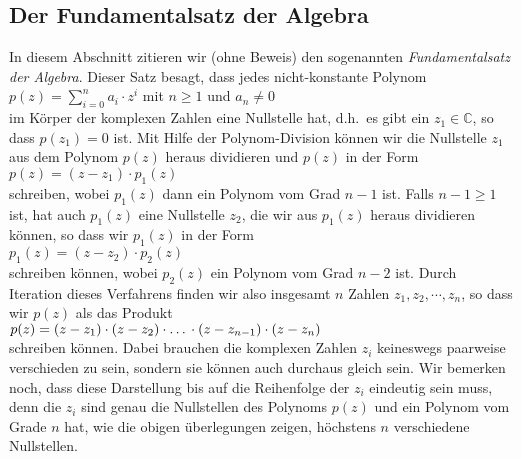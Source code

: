 \subsection{Der Fundamentalsatz der Algebra}
In diesem Abschnitt zitieren wir (ohne Beweis) den sogenannten \emph{Fundamentalsatz der Algebra}.  Dieser Satz
besagt, dass jedes nicht-konstante Polynom  
\\[0.2cm]
\hspace*{1.3cm}
$p(z) = \sum\limits_{i=0}^n a_i \cdot z^i$ \quad mit $n \geq 1$ und $a_n \not=0$
\\[0.2cm]
im K\"{o}rper der komplexen Zahlen eine Nullstelle hat, d.h.~es gibt ein $z_1 \in \mathbb{C}$, so dass
$p(z_1) = 0$ ist.  Mit Hilfe der Polynom-Division k\"{o}nnen wir die Nullstelle $z_1$ aus dem Polynom $p(z)$
heraus dividieren und $p(z)$ in der Form
\\[0.2cm]
\hspace*{1.3cm}
$p(z) = (z - z_1) \cdot p_1(z)$
\\[0.2cm]
schreiben, wobei $p_1(z)$ dann ein Polynom vom Grad $n-1$ ist.  Falls $n-1 \geq 1$ ist, hat auch
$p_1(z)$ eine Nullstelle $z_2$, die wir aus $p_1(z)$ heraus dividieren k\"{o}nnen, so dass wir $p_1(z)$
in der Form
\\[0.2cm]
\hspace*{1.3cm}
$p_1(z) = (z- z_2) \cdot p_2(z)$
\\[0.2cm]
schreiben k\"{o}nnen, wobei $p_2(z)$ ein Polynom vom Grad $n-2$ ist.  Durch Iteration dieses Verfahrens
finden wir also insgesamt $n$ Zahlen $z_1, z_2, \cdots, z_n$, so dass wir $p(z)$ als das Produkt
\\[0.2cm]
\hspace*{1.3cm}
$p(z) = (z-z_1) \cdot (z-z_2) \cdot \mbox{\dots} \cdot (z-z_{n-1}) \cdot (z - z_n)$
\\[0.2cm]
schreiben k\"{o}nnen.  Dabei brauchen die komplexen Zahlen $z_i$ keineswegs paarweise verschieden zu sein,
sondern sie k\"{o}nnen auch durchaus gleich sein.  Wir bemerken noch, dass diese Darstellung bis auf die
Reihenfolge der $z_i$ eindeutig sein muss, denn die $z_i$ sind genau die Nullstellen des Polynoms
$p(z)$ und ein Polynom vom Grade $n$ hat, wie die obigen \"{u}berlegungen zeigen, h\"{o}chstens $n$
verschiedene Nullstellen.
\vspace*{0.2cm} 

